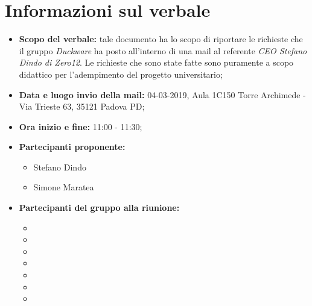 \clearpage
\section{Informazioni sul verbale}
\begin{itemize}
	\item \textbf {Scopo del verbale:} tale documento ha lo scopo di riportare le richieste che il gruppo \emph{Duckware} ha posto all'interno di una mail al referente \emph{CEO Stefano Dindo di Zero12}. Le richieste che sono state fatte sono puramente a scopo didattico per l'adempimento del progetto universitario;
	\item \textbf {Data e luogo invio della mail:} 04-03-2019, Aula 1C150 Torre Archimede - Via Trieste 63, 35121 Padova PD;
	\item \textbf {Ora inizio e fine:} 11:00 - 11:30;
	\item \textbf {Partecipanti proponente:} 
		\begin{itemize}
			\item Stefano Dindo
			\item Simone Maratea
		\end{itemize}
	\item \textbf {Partecipanti del gruppo alla riunione:} 
		 \begin{itemize}
			\item \sonia
			\item \luca
			\item \matteo
			\item \pardeep
			\item \alberto
			\item \alessandro
			\item \andrea
		\end{itemize}
\end{itemize}
